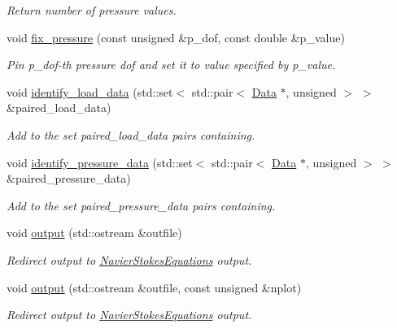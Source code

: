 \begin{DoxyCompactItemize}
\begin{DoxyCompactList}\small\item\em Return number of pressure values. \end{DoxyCompactList}\item 
void \hyperlink{classoomph_1_1GeneralisedNewtonianTTaylorHoodElement_a26ba51f8b7adebbd08e8969d622164d0}{fix\+\_\+pressure} (const unsigned \&p\+\_\+dof, const double \&p\+\_\+value)
\begin{DoxyCompactList}\small\item\em Pin p\+\_\+dof-\/th pressure dof and set it to value specified by p\+\_\+value. \end{DoxyCompactList}\item 
void \hyperlink{classoomph_1_1GeneralisedNewtonianTTaylorHoodElement_ac6da3eea70b3ad498c42a91dc9c67237}{identify\+\_\+load\+\_\+data} (std\+::set$<$ std\+::pair$<$ \hyperlink{classoomph_1_1Data}{Data} $\ast$, unsigned $>$ $>$ \&paired\+\_\+load\+\_\+data)
\begin{DoxyCompactList}\small\item\em Add to the set {\ttfamily paired\+\_\+load\+\_\+data} pairs containing. \end{DoxyCompactList}\item 
void \hyperlink{classoomph_1_1GeneralisedNewtonianTTaylorHoodElement_a9dba8c6c24e6105d289590f0b3ac0a40}{identify\+\_\+pressure\+\_\+data} (std\+::set$<$ std\+::pair$<$ \hyperlink{classoomph_1_1Data}{Data} $\ast$, unsigned $>$ $>$ \&paired\+\_\+pressure\+\_\+data)
\begin{DoxyCompactList}\small\item\em Add to the set {\ttfamily paired\+\_\+pressure\+\_\+data} pairs containing. \end{DoxyCompactList}\item 
void \hyperlink{classoomph_1_1GeneralisedNewtonianTTaylorHoodElement_a998c59443d1ac6472d036a5f0a839bed}{output} (std\+::ostream \&outfile)
\begin{DoxyCompactList}\small\item\em Redirect output to \hyperlink{classoomph_1_1NavierStokesEquations}{Navier\+Stokes\+Equations} output. \end{DoxyCompactList}\item 
void \hyperlink{classoomph_1_1GeneralisedNewtonianTTaylorHoodElement_a2c0b32513bf821e1b86efecfceaf2b08}{output} (std\+::ostream \&outfile, const unsigned \&nplot)
\begin{DoxyCompactList}\small\item\em Redirect output to \hyperlink{classoomph_1_1NavierStokesEquations}{Navier\+Stokes\+Equations} output. \end{DoxyCompactList}\item 

\end{DoxyCompactItemize}
